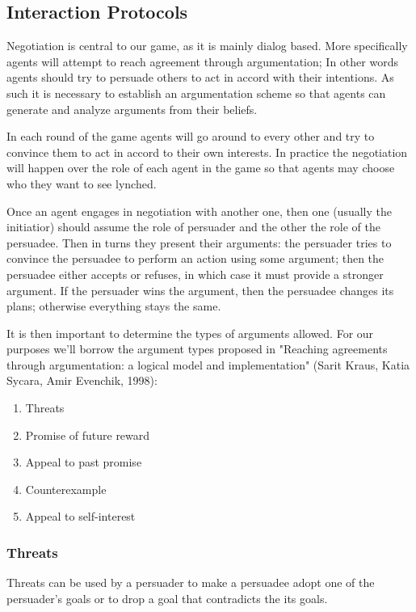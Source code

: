 \documentclass{article}
\begin{document}
\subsection{Interaction Protocols}

Negotiation is central to our game, as it is mainly dialog based. More specifically agents will attempt to reach agreement through argumentation; In other words agents should try to persuade others to act in accord with their intentions. As such it is necessary to establish an argumentation scheme so that agents can generate and analyze arguments from their beliefs.

In each round of the game agents will go around to every other and try to convince them to act in accord to their own interests. In practice the negotiation will happen over the role of each agent in the game so that agents may choose who they want to see lynched.

Once an agent engages in negotiation with another one, then one (usually the initiatior) should assume the role of persuader and the other the role of the persuadee. Then in turns they present their arguments: the persuader tries to convince the persuadee to perform an action using some argument; then the persuadee either accepts or refuses, in which case it must provide a stronger argument. If the persuader wins the argument, then the persuadee changes its plans; otherwise everything stays the same.

It is then important to determine the types of arguments allowed. For our purposes we'll borrow the argument types proposed in "Reaching agreements through argumentation: a logical model and implementation" (Sarit Kraus, Katia Sycara, Amir Evenchik, 1998):
\begin{enumerate}
\item{Threats}
\item{Promise of future reward}
\item{Appeal to past promise}
\item{Counterexample}
\item{Appeal to self-interest}
\end{enumerate}

\subsubsection{Threats}
Threats can be used by a persuader to make a persuadee adopt one of the persuader's goals or to drop a goal that contradicts the its goals. 
\end{document}

